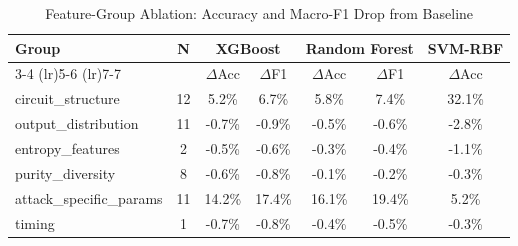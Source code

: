 \begin{table}[H]
\centering
\caption{Feature-Group Ablation: Accuracy and Macro-F1 Drop from Baseline}
\label{tab:ablation}
\begin{tabular}{lcccccc}
\toprule
\textbf{Group} & \textbf{N} & \multicolumn{2}{c}{\textbf{XGBoost}} & \multicolumn{2}{c}{\textbf{Random Forest}} & \textbf{SVM-RBF} \\
\cmidrule(lr){3-4} \cmidrule(lr){5-6} \cmidrule(lr){7-7}
 & & $\Delta$Acc & $\Delta$F1 & $\Delta$Acc & $\Delta$F1 & $\Delta$Acc \\
\midrule
circuit\_structure & 12 & 5.2\% & 6.7\% & 5.8\% & 7.4\% & 32.1\% \\
output\_distribution & 11 & -0.7\% & -0.9\% & -0.5\% & -0.6\% & -2.8\% \\
entropy\_features & 2 & -0.5\% & -0.6\% & -0.3\% & -0.4\% & -1.1\% \\
purity\_diversity & 8 & -0.6\% & -0.8\% & -0.1\% & -0.2\% & -0.3\% \\
attack\_specific\_params & 11 & 14.2\% & 17.4\% & 16.1\% & 19.4\% & 5.2\% \\
timing & 1 & -0.7\% & -0.8\% & -0.4\% & -0.5\% & -0.3\% \\
\bottomrule
\end{tabular}
\end{table}